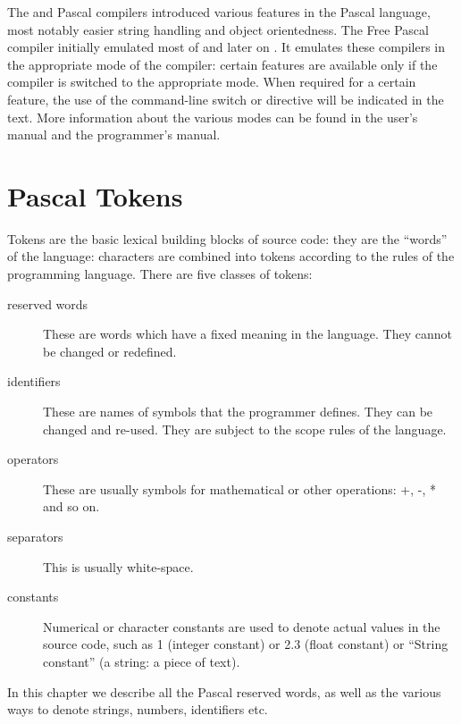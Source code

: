 The \tp and \delphi Pascal compilers introduced various features in the
Pascal language, most notably easier string handling and object orientedness.
The Free Pascal compiler initially emulated most of \tp and later on
\delphi. It emulates these compilers in the appropriate mode of the compiler:
certain features are available only if the compiler is switched to the appropriate
mode. When required for a certain feature, the use of the  command-line
switch or  directive will be indicated in the text. More information
about the various modes can be found in the user's manual and the
programmer's manual.


\chapter{Pascal Tokens}
Tokens are the basic lexical building blocks of source code: they are the
``words'' of the language: characters are combined into tokens according to
the rules of the programming language. There are five classes of tokens:
\begin{description}
\item[reserved words] These are words which have a fixed meaning in the
language. They cannot be changed or redefined.
\item[identifiers] These are names of symbols that the programmer defines.
They can be changed and re-used. They are subject to the scope rules of the
language.
\item[operators] These are usually symbols for mathematical or other
operations: +, -, * and so on.
\item[separators] This is usually white-space.
\item[constants] Numerical or character constants are used to denote actual
values in the source code, such as 1 (integer constant) or 2.3 (float
constant) or ``String constant'' (a string: a piece of text).
\end{description}

In this chapter we describe all the Pascal reserved words, as well as the
various ways to denote strings, numbers, identifiers etc.

